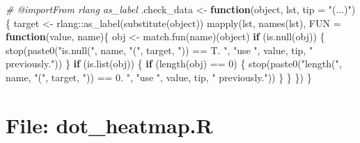 \documentclass[
]{article}
\newenvironment{Shaded}{\begin{snugshade}}{\end{snugshade}}
\newcommand{\AttributeTok}[1]{\textcolor[rgb]{0.77,0.63,0.00}{#1}}
\newcommand{\CommentTok}[1]{\textcolor[rgb]{0.56,0.35,0.01}{\textit{#1}}}
\newcommand{\ControlFlowTok}[1]{\textcolor[rgb]{0.13,0.29,0.53}{\textbf{#1}}}
\newcommand{\DecValTok}[1]{\textcolor[rgb]{0.00,0.00,0.81}{#1}}
\newcommand{\FunctionTok}[1]{\textcolor[rgb]{0.00,0.00,0.00}{#1}}
\newcommand{\NormalTok}[1]{#1}
\newcommand{\OtherTok}[1]{\textcolor[rgb]{0.56,0.35,0.01}{#1}}
\newcommand{\SpecialCharTok}[1]{\textcolor[rgb]{0.00,0.00,0.00}{#1}}
\newcommand{\StringTok}[1]{\textcolor[rgb]{0.31,0.60,0.02}{#1}}
\begin{document}
\begin{Shaded}
\begin{Highlighting}[]
\CommentTok{\#\textquotesingle{} @importFrom rlang as\_label}
\NormalTok{.check\_data }\OtherTok{\textless{}{-}} 
  \ControlFlowTok{function}\NormalTok{(object, lst, }\AttributeTok{tip =} \StringTok{"(...)"}\NormalTok{)\{}
\NormalTok{    target }\OtherTok{\textless{}{-}}\NormalTok{ rlang}\SpecialCharTok{::}\FunctionTok{as\_label}\NormalTok{(}\FunctionTok{substitute}\NormalTok{(object))}
    \FunctionTok{mapply}\NormalTok{(lst, }\FunctionTok{names}\NormalTok{(lst), }\AttributeTok{FUN =} \ControlFlowTok{function}\NormalTok{(value, name)\{}
\NormalTok{      obj }\OtherTok{\textless{}{-}} \FunctionTok{match.fun}\NormalTok{(name)(object)}
      \ControlFlowTok{if}\NormalTok{ (}\FunctionTok{is.null}\NormalTok{(obj)) \{}
        \FunctionTok{stop}\NormalTok{(}\FunctionTok{paste0}\NormalTok{(}\StringTok{"is.null("}\NormalTok{, name, }\StringTok{"("}\NormalTok{, target, }\StringTok{")) == T. "}\NormalTok{,}
            \StringTok{"use \textasciigrave{}"}\NormalTok{, value, tip, }\StringTok{"\textasciigrave{} previously."}\NormalTok{))}
\NormalTok{      \}}
      \ControlFlowTok{if}\NormalTok{ (}\FunctionTok{is.list}\NormalTok{(obj)) \{}
        \ControlFlowTok{if}\NormalTok{ (}\FunctionTok{length}\NormalTok{(obj) }\SpecialCharTok{==} \DecValTok{0}\NormalTok{) \{}
          \FunctionTok{stop}\NormalTok{(}\FunctionTok{paste0}\NormalTok{(}\StringTok{"length("}\NormalTok{, name, }\StringTok{"("}\NormalTok{, target, }\StringTok{")) == 0. "}\NormalTok{,}
              \StringTok{"use \textasciigrave{}"}\NormalTok{, value, tip, }\StringTok{"\textasciigrave{} previously."}\NormalTok{))}
\NormalTok{        \}}
\NormalTok{      \}}
\NormalTok{      \})}
\NormalTok{  \}}
\end{Highlighting}
\end{Shaded}

\hypertarget{file-dot_heatmap.r}{%
\section{File: dot\_heatmap.R}\label{file-dot_heatmap.r}}
\end{document}
